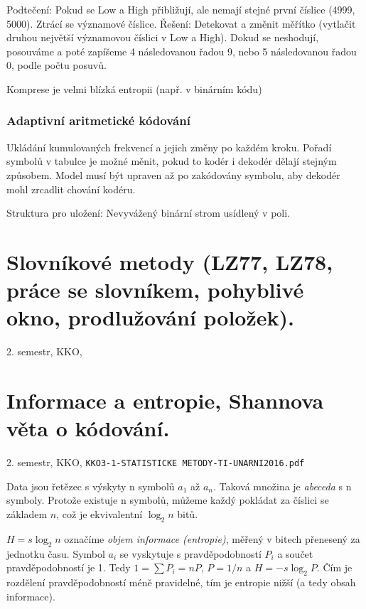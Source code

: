 \documentclass[a4paper, 11pt]{report}
\begin{document}
Podtečení: Pokud se Low a High přibližují, ale nemají stejné první číslice (4999, 5000). Ztrácí se významové číslice. Řešení: Detekovat a změnit měřítko (vytlačit druhou největší významovou číslici v Low a High). Dokud se neshodují, posouváme a poté zapíšeme 4 následovanou řadou 9, nebo 5 následovanou řadou 0, podle počtu posuvů.

Komprese je velmi blízká entropii (např. v binárním kódu)

\subsection{Adaptivní aritmetické kódování}
Ukládání kumulovaných frekvencí a jejich změny po každém kroku. Pořadí symbolů v tabulce je možné měnit, pokud to kodér i dekodér dělají stejným způsobem. Model musí být upraven až po zakódovány symbolu, aby dekodér mohl zrcadlit chování kodéru.

Struktura pro uložení: Nevyvážený binární strom usídlený v poli.

\chapter{Slovníkové metody (LZ77, LZ78, práce se slovníkem, pohyblivé okno, prodlužování položek).} \label{cha:36}
2. semestr, KKO, \texttt{}

\chapter{Informace a entropie, Shannova věta o kódování.} \label{cha:37}
2. semestr, KKO, \texttt{KKO3-1-STATISTICKE METODY-TI-UNARNI2016.pdf}

Data jsou řetězec s výskyty n symbolů $a_1$ až $a_n$. Taková množina je \emph{abeceda} s n symboly. Protože existuje n symbolů, můžeme každý pokládat za číslici se základem $n$, což je ekvivalentní $\log_2 n$ bitů.

$H = s \log_2 n$ označíme \emph{objem informace (entropie)}, měřený v bitech přenesený za jednotku času. Symbol $a_i$ se vyskytuje s pravděpodobností $P_i$ a součet pravděpodobností je 1. Tedy $1=\sum P_i = nP$, $P = 1/n$ a $H = -s \log_2 P$. Čím je rozdělení pravděpodobností méně pravidelné, tím je entropie nižší (a tedy obsah informace).
\end{document}
